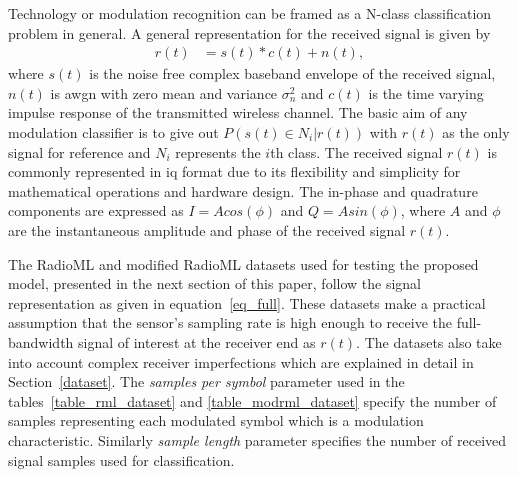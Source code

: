 Technology or modulation recognition can be framed as a N-class classification problem in general. A general representation for the received signal is given by
\begin{equation}
\begin{aligned}
r(t)&=s(t)*c(t)+n(t),
\end{aligned}
\label{eq_full}
\end{equation}
where $s(t)$ is the noise free complex baseband envelope of the received signal, $n(t)$ is \ac{awgn} with zero mean and variance $\sigma_n^2$ and $c(t)$ is the time varying impulse response of the transmitted wireless channel. The basic aim of any modulation classifier is to give out $P(s(t)\in N_i| r(t))$ with $r(t)$ as the only signal for reference and $N_i$ represents the $i$th class. The received signal $r(t)$ is commonly represented in \ac{iq} format due to its flexibility and simplicity for mathematical operations and hardware design. The in-phase and quadrature components are expressed as $I = A cos(\phi)$ and $Q = A sin(\phi)$, where $A$ and $\phi$ are the instantaneous amplitude and phase of the received signal $r(t)$.

The RadioML and modified RadioML datasets used for testing the proposed model, presented in the next section of this paper, follow the signal representation as given in equation~\ref{eq_full}. These datasets make a practical assumption that the sensor's sampling rate is high enough to receive the full-bandwidth signal of interest at the receiver end as $r(t)$. The datasets also take into account complex receiver imperfections which are explained in detail in Section~\ref{dataset}. The \textit{samples per symbol} parameter used in the tables~\ref{table_rml_dataset} and \ref{table_modrml_dataset} specify the number of samples representing each modulated symbol which is a modulation characteristic. Similarly \textit{sample length} parameter specifies the number of received signal samples used for classification.


